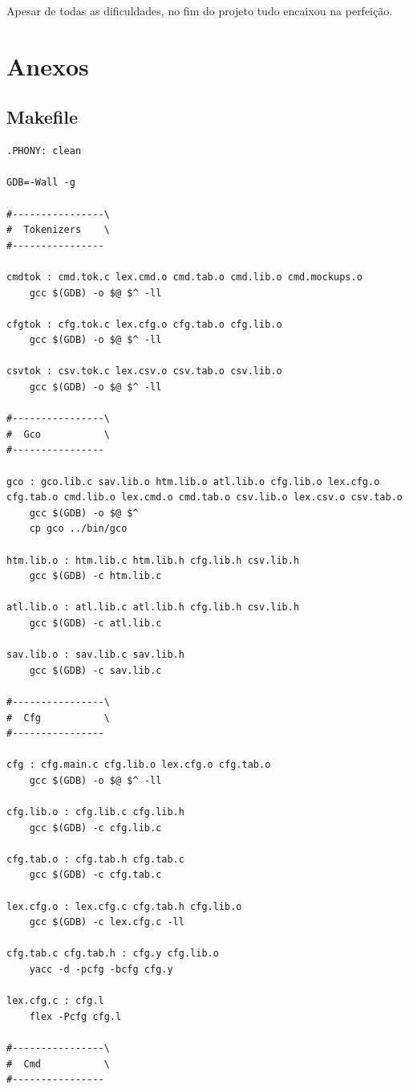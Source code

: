 \documentclass[11pt, a4paper, oneside]{article}
\begin{document}
Apesar de todas as dificuldades, no fim do projeto tudo encaixou na perfeição.

\newpage
\section{Anexos}

\subsection{Makefile}

\begin{lstlisting}[language={}, caption={Makefile}]
.PHONY: clean

GDB=-Wall -g

#----------------\
#  Tokenizers    \
#----------------

cmdtok : cmd.tok.c lex.cmd.o cmd.tab.o cmd.lib.o cmd.mockups.o
	gcc $(GDB) -o $@ $^ -ll

cfgtok : cfg.tok.c lex.cfg.o cfg.tab.o cfg.lib.o
	gcc $(GDB) -o $@ $^ -ll

csvtok : csv.tok.c lex.csv.o csv.tab.o csv.lib.o
	gcc $(GDB) -o $@ $^ -ll

#----------------\ 
#  Gco           \ 
#----------------

gco : gco.lib.c sav.lib.o htm.lib.o atl.lib.o cfg.lib.o lex.cfg.o cfg.tab.o cmd.lib.o lex.cmd.o cmd.tab.o csv.lib.o lex.csv.o csv.tab.o
	gcc $(GDB) -o $@ $^
	cp gco ../bin/gco

htm.lib.o : htm.lib.c htm.lib.h cfg.lib.h csv.lib.h
	gcc $(GDB) -c htm.lib.c

atl.lib.o : atl.lib.c atl.lib.h cfg.lib.h csv.lib.h
	gcc $(GDB) -c atl.lib.c

sav.lib.o : sav.lib.c sav.lib.h
	gcc $(GDB) -c sav.lib.c

#----------------\ 
#  Cfg           \ 
#----------------

cfg : cfg.main.c cfg.lib.o lex.cfg.o cfg.tab.o
	gcc $(GDB) -o $@ $^ -ll

cfg.lib.o : cfg.lib.c cfg.lib.h
	gcc $(GDB) -c cfg.lib.c

cfg.tab.o : cfg.tab.h cfg.tab.c
	gcc $(GDB) -c cfg.tab.c

lex.cfg.o : lex.cfg.c cfg.tab.h cfg.lib.o
	gcc $(GDB) -c lex.cfg.c -ll

cfg.tab.c cfg.tab.h : cfg.y cfg.lib.o
	yacc -d -pcfg -bcfg cfg.y

lex.cfg.c : cfg.l
	flex -Pcfg cfg.l

#----------------\
#  Cmd           \
#----------------


\end{lstlisting}
\end{document}
